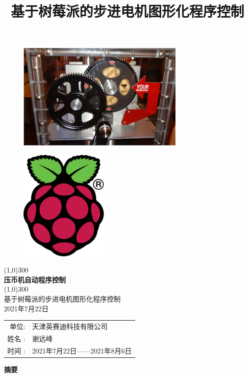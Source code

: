 \documentclass[UTF8,14pt]{article}
\title{基于树莓派的步进电机图形化程序控制}
\newcommand\sectionone[1]{\centerline{\Large{\bfseries{#1}}}}
\begin{document}
\begin{titlepage}
	\begin{center}
		\begin{figure}
			\centering
			\includegraphics[width=8.2cm]{figures/压币机.pdf}
		\end{figure}
		\vspace{0.2cm}
		\begin{figure}
			\centering
			\includegraphics[width=4.35cm]{figures/RPi-Logo-Reg-SCREEN.pdf}
		\end{figure}
		\vspace*{0.7cm}
		\line(1,0){300}\\
		[-0.2cm]
		\Huge{\bfseries 压币机自动程序控制}\\
		\vspace*{-0.7cm}
		\line(1,0){300}\\
		\LARGE {基于树莓派的步进电机图形化程序控制\\
			2021年7月22日}\\
		[0.6cm]
		\Large{
			\begin{tabular}{rl}
				单位:         & 天津英赛迪科技有限公司      \\
				姓名        : & 谢远峰                      \\
				时间       :  & 2021年7月22日——2021年8月6日
			\end{tabular}
		}
	\end{center}

\end{titlepage}
\clearpage
\sectionone{摘要}
\end{document}
